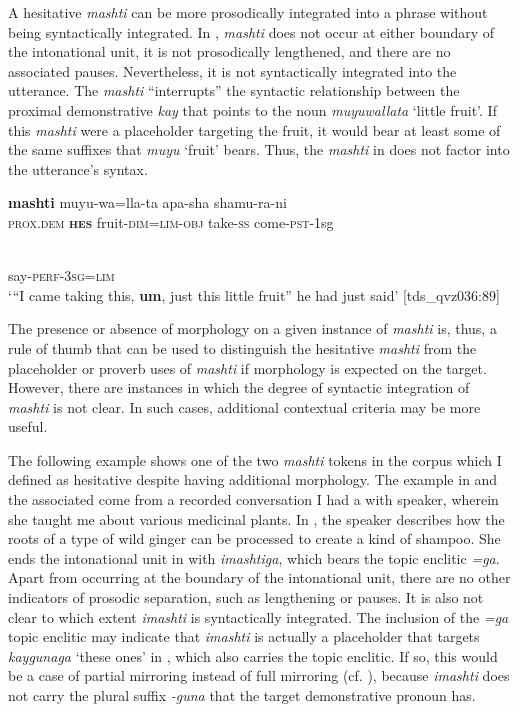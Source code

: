 \documentclass[output=paper]{langscibook}
\begin{document}
A hesitative \textit{mashti} can be more prosodically integrated into a phrase without being syntactically integrated. In , \textit{mashti} does not occur at either boundary of the intonational unit, it is not prosodically lengthened, and there are no associated pauses. Nevertheless, it is not syntactically integrated into the utterance. The \textit{mashti} “interrupts” the syntactic relationship between the proximal demonstrative \textit{kay} that points to the noun \textit{muyuwallata} ‘little fruit’. If this \textit{mashti} were a placeholder targeting the fruit, it would bear at least some of the same suffixes that \textit{muyu} ‘fruit’ bears. Thus, the \textit{mashti} in  does not factor into the utterance’s syntax.

\ea%
    \label{ex:rice:4}
     {\textbf{mashti}} {muyu-wa=lla-ta}  {apa-sha}  {shamu-ra-ni} \\
    {\textsc{prox.dem}}  {\textbf{\textsc{hes}}}    {fruit-\textsc{dim=lim-obj}}  {take-\textsc{ss}}    {come-\textsc{pst}{}-1sg} \\
    
    \medskip
    
\\
	{say-\textsc{perf-3sg=lim}}\\
    \glt ‘“I came taking this, \textbf{um}, just this little fruit” he had just said’ [tds\_qvz036:89]
    \z

The presence or absence of morphology on a given instance of \textit{mashti} is, thus, a rule of thumb that can be used to distinguish the hesitative \textit{mashti} from the placeholder or proverb uses of \textit{mashti} if morphology is expected on the target. However, there are instances in which the degree of syntactic integration of \textit{mashti} is not clear. In such cases, additional contextual criteria may be more useful.

The following example shows one of the two \textit{mashti} tokens in the corpus which I defined as hesitative despite having additional morphology. The example in  and the associated  come from a recorded conversation I had a with speaker, wherein she taught me about various medicinal plants. In , the speaker describes how the roots of a type of wild ginger can be processed to create a kind of shampoo. She ends the intonational unit in  with \textit{imashtiga}, which bears the topic enclitic \textit{=ga}. Apart from occurring at the boundary of the intonational unit, there are no other indicators of prosodic separation, such as lengthening or pauses. It is also not clear to which extent \textit{imashti} is syntactically integrated. The inclusion of the \textit{=ga} topic enclitic may indicate that \textit{imashti} is actually a placeholder that targets \textit{kaygunaga} ‘these ones’ in , which also carries the topic enclitic. If so, this would be a case of partial mirroring instead of full mirroring (cf. ), because \textit{imashti} does not carry the plural suffix \textit{{}-guna} that the target demonstrative pronoun has.    
\end{document}
